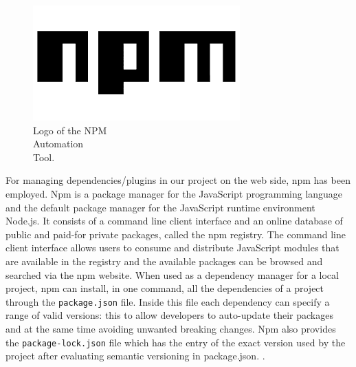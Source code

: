 \begin{figure} %
    \captionsetup{font=footnotesize}
    \centering
    \includegraphics[width=\linewidth]{images/npm.png}
    \caption{Logo of the NPM\\Automation\\Tool.}
\end{figure}

For managing dependencies/plugins in our project on the web side, npm has been employed. Npm is a package manager for the JavaScript programming language and the default package manager for the JavaScript runtime environment Node.js. It consists of a command line client interface and an online database of public and paid-for private packages, called the npm registry. The command line client interface allows users to consume and distribute JavaScript modules that are available in the registry and the available packages can be browsed and searched via the npm website. When used as a dependency manager for a local project, npm can install, in one command, all the dependencies of a project through the \texttt{package.json} file. Inside this file each dependency can specify a range of valid versions: this to allow developers to auto-update their packages and at the same time avoiding unwanted breaking changes. Npm also provides the \texttt{package-lock.json} file which has the entry of the exact version used by the project after evaluating semantic versioning in package.json.  \cite{NPM}.



